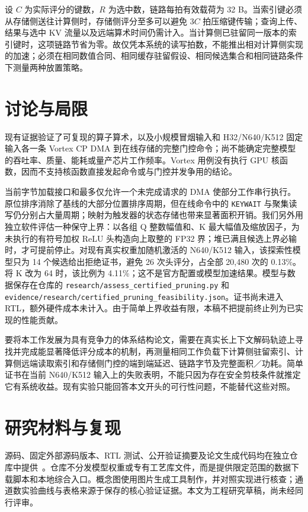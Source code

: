 设 $C$ 为实际评分的键数，$R$ 为选中数，链路每拍有效载荷为 32 B。当索引键必须从存储侧送往计算侧时，存储侧评分至多可以避免 $3C$ 拍压缩键传输；查询上传、结果与选中 KV 流量以及远端算术时间仍需计入。当计算侧已驻留同一版本的索引键时，这项链路节省为零。故仅凭本系统的读写拍数，不能推出相对计算侧实现的加速；必须在相同数值合同、相同缓存驻留假设、相同候选集合和相同链路条件下测量两种放置策略。

\section{讨论与局限}
现有证据验证了可复现的算子算术，以及小规模冒烟输入和 H32/N640/K512 固定输入各一条 Vortex CP DMA 到在线存储的完整门控命令；尚不能确定完整模型的吞吐率、质量、能耗或量产芯片工作频率。Vortex 用例没有执行 GPU 核函数，因而不支持核函数直接发起命令或与门控并发争用的结论。

当前字节加载接口和最多仅允许一个未完成请求的 DMA 使部分工作串行执行。原位排序消除了基线的大部分位置排序周期，但在线命令中的 \texttt{KEYWAIT} 与聚集读写仍分别占大量周期；映射为触发器的状态存储也带来显著面积开销。我们另外用独立软件评估一种保守上界：以各组 Q 整数幅值和、K 最大幅值及缩放因子，为未执行的有符号加权 ReLU 头构造向上取整的 FP32 界；堆已满且候选上界必输时，才可提前停止。对现有真实权重加随机激活的 N640/K512 输入，该探索性模型只为 14 个候选给出拒绝证书，避免 26 次头评分，占全部 20,480 次的 0.13\%。将 K 改为 64 时，该比例为 4.11\%；这不是官方配置或模型加速结果。模型与数据保存在仓库的 \texttt{research/assess\_certified\_pruning.py} 和 \texttt{evidence/research/certified\_pruning\_feasibility.json}。证书尚未进入 RTL，额外硬件成本未计入。由于简单上界收益有限，本稿不把提前终止列为已实现的性能贡献。

要将本工作发展为具有竞争力的体系结构论文，需要在真实长上下文解码轨迹上寻找并完成能显著降低评分成本的机制，再测量相同工作负载下计算侧驻留索引、计算侧远端读取索引和存储侧门控的端到端延迟、链路字节及完整面积／功耗。简单证书在当前 N640/K512 输入上的失败表明，不能只因为存在安全剪枝条件就推定它有系统收益。现有实验只能回答本文开头的可行性问题，不能替代这些对照。

\section{研究材料与复现}
源码、固定外部源码版本、RTL 测试、公开验证摘要及论文生成代码均在独立仓库中提供~\cite{artifact}。仓库不分发模型权重或专有工艺库文件，而是提供限定范围的数据下载脚本和本地综合入口。概念图使用图片生成工具制作，并对照实现进行核查；通道数实验曲线与表格来源于保存的核心验证证据。本文为工程研究草稿，尚未经同行评审。
